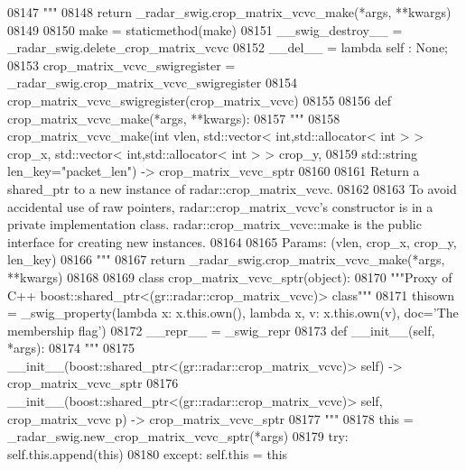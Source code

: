 \begin{DoxyCode}
{{{{{{{{{{{{{{{{{{{{{{{{{{{08147 \textcolor{stringliteral}{        """}
08148         \textcolor{keywordflow}{return} \_radar\_swig.crop\_matrix\_vcvc\_make(*args, **kwargs)
08149 
08150     make = staticmethod(make)
08151     \_\_swig\_destroy\_\_ = \_radar\_swig.delete\_crop\_matrix\_vcvc
08152     \_\_del\_\_ = \textcolor{keyword}{lambda} self : \textcolor{keywordtype}{None};
08153 crop\_matrix\_vcvc\_swigregister = \_radar\_swig.crop\_matrix\_vcvc\_swigregister
08154 crop_matrix_vcvc_swigregister(crop\_matrix\_vcvc)
08155 
08156 \textcolor{keyword}{def }crop_matrix_vcvc_make(*args, **kwargs):
08157   \textcolor{stringliteral}{"""}
08158 \textcolor{stringliteral}{    crop\_matrix\_vcvc\_make(int vlen, std::vector< int,std::allocator< int > > crop\_x, std::vector<
       int,std::allocator< int > > crop\_y, }
08159 \textcolor{stringliteral}{        std::string len\_key="packet\_len") -> crop\_matrix\_vcvc\_sptr}
08160 \textcolor{stringliteral}{}
08161 \textcolor{stringliteral}{    Return a shared\_ptr to a new instance of radar::crop\_matrix\_vcvc.}
08162 \textcolor{stringliteral}{}
08163 \textcolor{stringliteral}{    To avoid accidental use of raw pointers, radar::crop\_matrix\_vcvc's constructor is in a private
       implementation class. radar::crop\_matrix\_vcvc::make is the public interface for creating new instances.}
08164 \textcolor{stringliteral}{}
08165 \textcolor{stringliteral}{    Params: (vlen, crop\_x, crop\_y, len\_key)}
08166 \textcolor{stringliteral}{    """}
08167   \textcolor{keywordflow}{return} \_radar\_swig.crop\_matrix\_vcvc\_make(*args, **kwargs)
08168 
08169 \textcolor{keyword}{class }crop_matrix_vcvc_sptr(object):
08170     \textcolor{stringliteral}{"""Proxy of C++ boost::shared\_ptr<(gr::radar::crop\_matrix\_vcvc)> class"""}
08171     thisown = _swig_property(\textcolor{keyword}{lambda} x: x.this.own(), \textcolor{keyword}{lambda} x, v: x.this.own(v), doc=\textcolor{stringliteral}{'The membership flag'})
08172     \_\_repr\_\_ = \_swig\_repr
08173     \textcolor{keyword}{def }__init__(self, *args): 
08174         \textcolor{stringliteral}{"""}
08175 \textcolor{stringliteral}{        \_\_init\_\_(boost::shared\_ptr<(gr::radar::crop\_matrix\_vcvc)> self) -> crop\_matrix\_vcvc\_sptr}
08176 \textcolor{stringliteral}{        \_\_init\_\_(boost::shared\_ptr<(gr::radar::crop\_matrix\_vcvc)> self, crop\_matrix\_vcvc p) ->
       crop\_matrix\_vcvc\_sptr}
08177 \textcolor{stringliteral}{        """}
08178         this = \_radar\_swig.new\_crop\_matrix\_vcvc\_sptr(*args)
08179         \textcolor{keywordflow}{try}: self.this.append(this)
08180         \textcolor{keywordflow}{except}: self.this = this
}}}}}}}}}}}}}}}}}}}}}}}}}}}
\end{DoxyCode}
